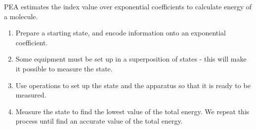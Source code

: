 \documentclass[14pt,landscape,color=UCLdarkred,margin=3cm]{uclposter}
\begin{document}
\begin{multicols}{3}
PEA estimates the index value over exponential coefficients to calculate energy of a molecule.


\begin{highlightbox}
\begin{enumerate}
\item Prepare a starting state, and encode information onto an exponential coefficient. 
\item Some equipment must be set up in a superposition of states - this will make it possible to measure the state.
\item Use operations to set up the state and the apparatus so that it is ready to be measured. 
\item Measure the state to find the lowest value of the total energy. We repeat this process until find an accurate value of the total energy.
\end{enumerate}
\end{highlightbox}



\end{multicols}
\end{document}
